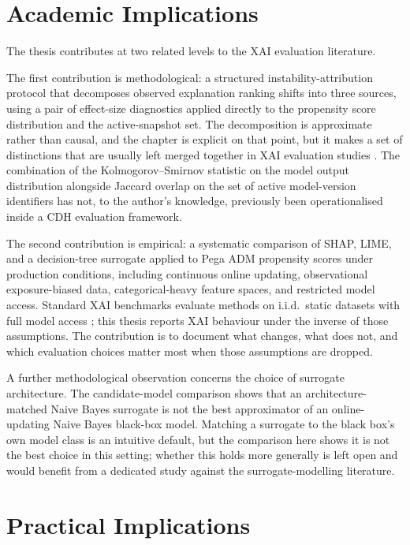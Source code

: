 \documentclass[oneside]{memoir} %
\begin{document}
\section{Academic Implications}

The thesis contributes at two related levels to the XAI evaluation literature.

The first contribution is methodological: a structured instability-attribution protocol that decomposes observed explanation ranking shifts into three sources, using a pair of effect-size diagnostics applied directly to the propensity score distribution and the active-snapshot set. The decomposition is approximate rather than causal, and the chapter is explicit on that point, but it makes a set of distinctions that are usually left merged together in XAI evaluation studies \parencite{nauta_anecdotal_2023}. The combination of the Kolmogorov--Smirnov statistic on the model output distribution alongside Jaccard overlap on the set of active model-version identifiers has not, to the author's knowledge, previously been operationalised inside a CDH evaluation framework.

The second contribution is empirical: a systematic comparison of SHAP, LIME, and a decision-tree surrogate applied to Pega ADM propensity scores under production conditions, including continuous online updating, observational exposure-biased data, categorical-heavy feature spaces, and restricted model access. Standard XAI benchmarks evaluate methods on i.i.d.\ static datasets with full model access \parencite{hooker_benchmark_2019, nauta_anecdotal_2023}; this thesis reports XAI behaviour under the inverse of those assumptions. The contribution is to document what changes, what does not, and which evaluation choices matter most when those assumptions are dropped.

A further methodological observation concerns the choice of surrogate architecture. The candidate-model comparison shows that an architecture-matched Naive Bayes surrogate is not the best approximator of an online-updating Naive Bayes black-box model. Matching a surrogate to the black box's own model class is an intuitive default, but the comparison here shows it is not the best choice in this setting; whether this holds more generally is left open and would benefit from a dedicated study against the surrogate-modelling literature.

\section{Practical Implications}
\end{document}
